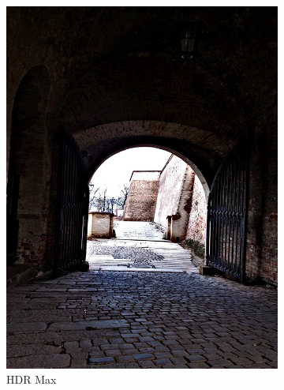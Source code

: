 \begin{figure}[h!]
    \begin{subfigure}{0.3\textwidth}
        \includegraphics[width=\textwidth]{figures/tests/hdrApps/hdrMax}
        \caption{HDR Max}
        \label{fig:apps_3}
    \end{subfigure}
    ~
    \begin{subfigure}{0.3\textwidth}

\end{subfigure}
\end{figure}
